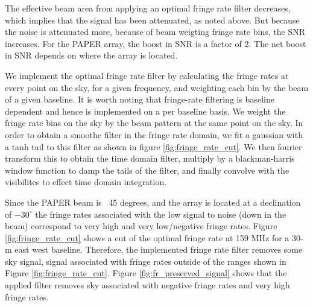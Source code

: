 \documentclass[twocolumn,numberedappendix]{emulateapj} \shorttitle{PSA64}
\begin{document}
The effective beam area from applying an optimal fringe rate filter decreases,
which implies that the signal has been attenuated, as noted above. But because
the noise is attenuated more, because of beam weigting fringe rate bins, the SNR
increases. For the PAPER array, the boost in SNR is a factor of 2. The net boost
in SNR depends on where the array is located. 

We implement the optimal fringe rate filter by calculating the fringe rates at
every point on the sky, for a given frequency, and weighting each bin by the
beam of a given baseline. It is worth noting that fringe-rate filtering is
baseline dependent and hence is implemented on a per baseline basis. We weight
the fringe rate bins on the sky by the beam pattern at the same point on the
sky. In order to obtain a smoothe filter in the fringe rate domain, we fit a
gaussian with a tanh tail to this filter as shown in figure
\ref{fig:fringe_rate_cut}. We then fourier transform this to obtain the time
domain filter, multiply by a blackman-harris window function to damp the tails
of the filter, and finally convolve with the visibilites to effect time domain
integration.

Since the PAPER beam is ~45 degrees, and the array is located at a declination
of $-30^{\circ}$ the fringe rates associated with the low signal to noise (down
in the beam) correspond to very high and very low/negative fringe rates. Figure
\ref{fig:fringe_rate_cut} shows a cut of the optimal fringe rate at 159 MHz for
a 30-m east west baseline. Therefore, the implemented fringe rate filter removes
some sky signal, signal associated with fringe rates outside of the ranges shown
in Figure \ref{fig:fringe_rate_cut}. Figure \ref{fig:fr_preserved_signal} shows
that the applied filter removes sky associated with negative fringe rates and
very high fringe rates. 

\end{document}
